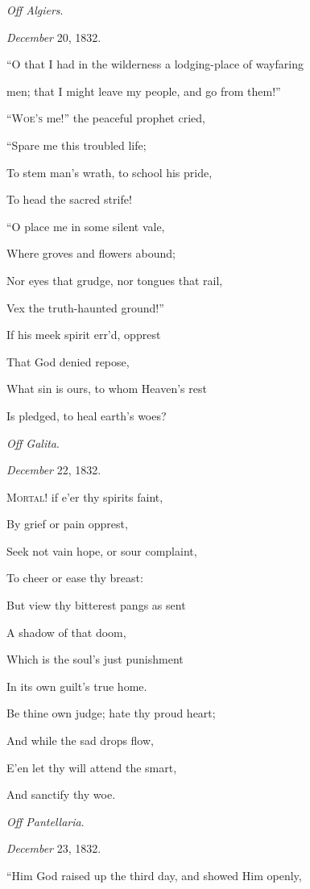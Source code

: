 \emph{Off Algiers}.

\emph{December} 20, 1832.


``O that I had in the wilderness a
lodging-place of wayfaring

men; that I might leave my people, and go from them!''

``W\textsc{oe's} me!'' the peaceful prophet cried,

``Spare me this troubled life;

To stem man's wrath, to school his pride,

To head the sacred strife!

``O place me in some silent vale,

Where groves and flowers abound;

Nor eyes that grudge, nor tongues that rail,

Vex the truth-haunted ground!''

If his meek spirit err'd, opprest

That God denied repose,

What sin is ours, to whom Heaven's rest

Is pledged, to heal earth's woes?

\emph{Off Galita}.

\emph{December} 22, 1832.


M\textsc{ortal}! if e'er thy spirits faint,

By grief or pain opprest,

Seek not vain hope, or sour complaint,

To cheer or ease thy breast:

But view thy bitterest pangs as sent

A shadow of that doom,

Which is the soul's just punishment

In its own guilt's true home.

Be thine own judge; hate thy proud heart;

And while the sad drops flow,

E'en let thy will attend the smart,

And sanctify thy woe.

\emph{Off Pantellaria}.

\emph{December} 23, 1832.


``Him God raised up the third day, and showed Him
openly,

